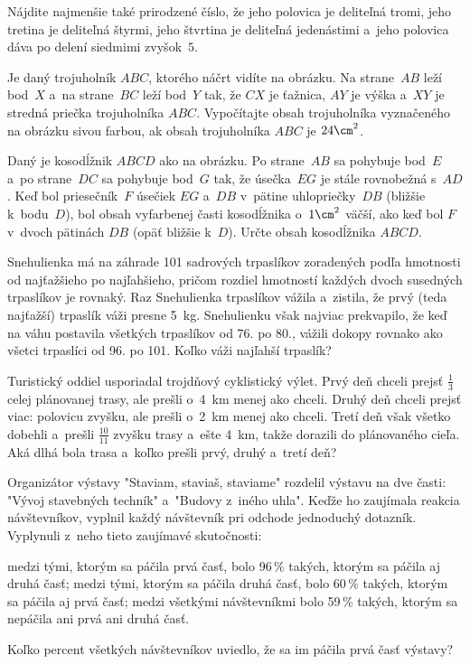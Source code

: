 {%
Nájdite najmenšie také prirodzené číslo, že jeho polovica je deliteľná tromi, jeho tretina je deliteľná štyrmi, jeho štvrtina je deliteľná jedenástimi a~jeho polovica dáva po delení siedmimi zvyšok~$5$.}

{%
Je daný trojuholník $ABC$, ktorého náčrt vidíte na \ifobrazkyvedla{}obrázku\else\obr{}\fi{}. Na strane~$AB$ leží bod~$X$ a~na strane~$BC$ leží bod~$Y$ tak, že $CX$ je ťažnica, $AY$ je výška a~$XY$ je stredná priečka trojuholníka $ABC$. Vypočítajte obsah trojuholníka vyznačeného na obrázku sivou farbou, ak obsah trojuholníka $ABC$ je $24\cm^2$.
\ifobrazkyvedla\else{}\fi%
}

{%
Daný je kosodĺžnik $ABCD$ ako na \ifobrazkyvedla{}obrázku\else\obr{}\fi{}.
Po strane~$AB$ sa pohybuje bod~$E$ a~po strane~$DC$ sa pohybuje bod~$G$ tak, že úsečka~$EG$ je stále rovnobežná s~$AD$.
Keď bol priesečník~$F$ úsečiek $EG$ a~$DB$ v~pätine uhlopriečky~$DB$ (bližšie k~bodu~$D$),
bol obsah vyfarbenej časti kosodĺžnika o~$1\cm^2$ väčší, ako keď
bol $F$ v~dvoch pätinách $DB$ (opäť bližšie k~$D$).
Určte obsah kosodĺžnika $ABCD$.
\ifobrazkyvedla\else{}\fi%
}

{%
Snehulienka má na záhrade 101 sadrových trpaslíkov zoradených podľa
hmotnosti od najťažšieho po najľahšieho, pričom rozdiel hmotností každých dvoch susedných
trpaslíkov je rovnaký.
Raz Snehulienka trpaslíkov vážila a~zistila, že prvý (teda najťažší) trpaslík váži presne 5~kg.
Snehulienku však najviac prekvapilo, že keď na váhu postavila všetkých trpaslíkov od 76. po 80.,
vážili dokopy rovnako ako všetci trpaslíci od 96. po 101.
Koľko váži najľahší trpaslík?}

{%
Turistický oddiel usporiadal trojdňový cyklistický výlet. Prvý deň chceli prejsť $\frac13$ celej plánovanej trasy, ale prešli o~4~km menej ako chceli.
Druhý deň chceli prejsť viac: polovicu zvyšku, ale prešli o~2~km menej ako chceli.
Tretí deň však všetko dobehli a~prešli $\frac{10}{11}$ zvyšku trasy a~ešte 4~km, takže dorazili do plánovaného cieľa.
Aká dlhá bola trasa a~koľko prešli prvý, druhý a~tretí deň?}

{%
Organizátor výstavy "Staviam, staviaš, staviame" rozdelil výstavu na dve časti: "Vývoj stavebných techník"
a~"Budovy z~iného uhla". Keďže ho zaujímala reakcia návštevníkov, vyplnil každý návštevník pri odchode
jednoduchý dotazník. Vyplynuli z~neho tieto zaujímavé skutočnosti:
\begin{itemize}
  \iitem medzi tými, ktorým sa páčila prvá časť, bolo 96\,\% takých, ktorým sa páčila aj druhá časť;
  \iitem medzi tými, ktorým sa páčila druhá časť, bolo 60\,\% takých, ktorým sa páčila aj prvá časť;
  \iitem medzi všetkými návštevníkmi bolo 59\,\% takých, ktorým sa nepáčila ani prvá ani druhá časť.
\end{itemize}

Koľko percent všetkých návštevníkov uviedlo, že sa im páčila prvá časť výstavy?}

